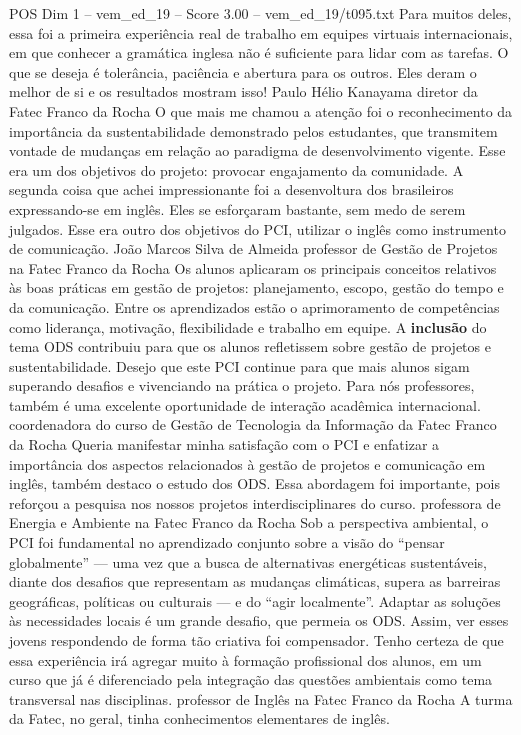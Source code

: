 \begin{textsample}{POS Dim 1 – vem\_ed\_19 – Score 3.00 – vem\_ed\_19/t095.txt}
Para muitos deles, essa foi a primeira experiência real de trabalho em equipes virtuais internacionais, em que conhecer a gramática inglesa não é suficiente para lidar com as tarefas.
O que se deseja é tolerância, paciência e abertura para os outros.
Eles deram o melhor de si e os resultados mostram isso!
Paulo Hélio Kanayama diretor da Fatec Franco da Rocha O que mais me chamou a atenção foi o reconhecimento da importância da sustentabilidade demonstrado pelos estudantes, que transmitem vontade de mudanças em relação ao paradigma de desenvolvimento vigente.
Esse era um dos objetivos do projeto: provocar engajamento da comunidade.
A segunda coisa que achei impressionante foi a desenvoltura dos brasileiros expressando-se em inglês.
Eles se esforçaram bastante, sem medo de serem julgados.
Esse era outro dos objetivos do PCI, utilizar o inglês como instrumento de comunicação.
João Marcos Silva de Almeida professor de Gestão de Projetos na Fatec Franco da Rocha Os alunos aplicaram os principais conceitos relativos às boas práticas em gestão de projetos: planejamento, escopo, gestão do tempo e da comunicação.
Entre os aprendizados estão o aprimoramento de competências como liderança, motivação, flexibilidade e trabalho em equipe.
A \textbf{inclusão} do tema ODS contribuiu para que os alunos refletissem sobre gestão de projetos e sustentabilidade.
Desejo que este PCI continue para que mais alunos sigam superando desafios e vivenciando na prática o projeto.
Para nós professores, também é uma excelente oportunidade de interação acadêmica internacional. coordenadora do curso de Gestão de Tecnologia da Informação da Fatec Franco da Rocha Queria manifestar minha satisfação com o PCI e enfatizar a importância dos aspectos relacionados à gestão de projetos e comunicação em inglês, também destaco o estudo dos ODS.
Essa abordagem foi importante, pois reforçou a pesquisa nos nossos projetos interdisciplinares do curso. professora de Energia e Ambiente na Fatec Franco da Rocha Sob a perspectiva ambiental, o PCI foi fundamental no aprendizado conjunto sobre a visão do “pensar globalmente” — uma vez que a busca de alternativas energéticas sustentáveis, diante dos desafios que representam as mudanças climáticas, supera as barreiras geográficas, políticas ou culturais — e do “agir localmente”.
Adaptar as soluções às necessidades locais é um grande desafio, que permeia os ODS.
Assim, ver esses jovens respondendo de forma tão criativa foi compensador.
Tenho certeza de que essa experiência irá agregar muito à formação profissional dos alunos, em um curso que já é diferenciado pela integração das questões ambientais como tema transversal nas disciplinas. professor de Inglês na Fatec Franco da Rocha A turma da Fatec, no geral, tinha conhecimentos elementares de inglês.

\end{textsample}
